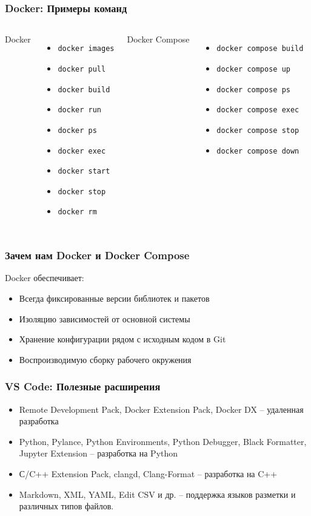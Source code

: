 \documentclass[aspectratio=169]{beamer}
\newcommand{\term}[1]{{\large\textcolor{HSEblue}{#1}}}
\newcommand{\cmd}[1]{\texttt{#1}}
\begin{document}
\begin{frame}
\frametitle{Docker:  Примеры команд}
\vfill
\begin{columns}[T]
\term{Docker}
\begin{itemize}
	\item  \cmd{docker images}
	\item  \cmd{docker pull}
	\item  \cmd{docker build}
	\item  \cmd{docker run}
	\item  \cmd{docker ps}
	\item  \cmd{docker exec}
	\item  \cmd{docker start}
	\item  \cmd{docker stop}
	\item  \cmd{docker rm}
\end{itemize}
\term{Docker Compose}
\begin{itemize}
	\item \cmd{docker compose build}
	\item \cmd{docker compose up}
	\item \cmd{docker compose ps}
	\item \cmd{docker compose exec}
	\item \cmd{docker compose stop}
	\item \cmd{docker compose down}
\end{itemize}
\end{columns}
\end{frame}


\begin{frame}
\frametitle{Зачем нам Docker и Docker Compose}
\begin{block}{Docker обеспечивает:}
	\begin{itemize}
	\item Всегда фиксированные версии библиотек и пакетов
	\item Изоляцию зависимостей от основной системы
	\item Хранение конфигурации рядом с исходным кодом в Git
	\item Воспроизводимую сборку рабочего окружения
\end{itemize}
	
\end{block}
\end{frame}


\begin{frame}
\frametitle{VS Code: Полезные расширения}
\begin{itemize}
	\item Remote Development Pack, Docker Extension Pack, Docker DX -- удаленная разработка
	\item Python, Pylance, Python Environments, Python Debugger, Black Formatter, Jupyter Extension -- разработка на Python
	\item С/C++ Extension Pack, clangd, Clang-Format -- разработка на C++
	\item Markdown, XML, YAML, Edit CSV и др. -- поддержка языков разметки и различных типов файлов.
\end{itemize}
\vfill
\end{frame}
\end{document}
